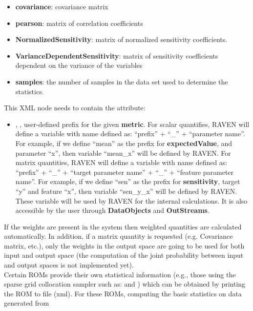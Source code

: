 \begin{itemize}
\begin{itemize}
    \item \textbf{covariance}: covariance matrix
    \item \textbf{pearson}: matrix of correlation coefficients
    \item \textbf{NormalizedSensitivity}: matrix of normalized sensitivity
    coefficients. 
    \item \textbf{VarianceDependentSensitivity}: matrix of sensitivity coefficients dependent on the variance of the variables
    \item \textbf{samples}: the number of samples in the data set used to determine the statistics.
  \end{itemize}
  This XML node needs to contain the attribute:
  \begin{itemize}
    \itemsep0em
    \item {}, , user-defined prefix for the given \textbf{metric}.
      For scalar quantifies, RAVEN will define a variable with name defined as:  ``prefix'' + ``\_'' + ``parameter name''.
      For example, if we define ``mean'' as the prefix for \textbf{expectedValue}, and parameter ``x'', then variable
      ``mean\_x'' will be defined by RAVEN.
      For matrix quantities, RAVEN will define a variable with name defined as: ``prefix'' + ``\_'' + ``target parameter name'' + ``\_'' + ``feature parameter name''.
      For example, if we define ``sen'' as the prefix for \textbf{sensitivity}, target ``y'' and feature ``x'', then
      variable ``sen\_y\_x'' will be defined by RAVEN.
      \nb These variable will be used by RAVEN for the internal calculations. It is also accessible by the user through
      \textbf{DataObjects} and \textbf{OutStreams}. 
  \end{itemize}
  \nb If the weights are present in the system then weighted quantities are calculated automatically. In addition, if a matrix quantity is requested (e.g. Covariance matrix, etc.), only the weights in the output space are going to be used for both input and output space (the computation of the joint probability between input and output spaces is not implemented yet).
  \\
  \nb Certain ROMs provide their own statistical information (e.g., those using
  the sparse grid collocation sampler such as: 
  and ) which can be obtained by printing the ROM to file
  (xml). For these ROMs, computing the basic statistics on data generated from

\end{itemize}
